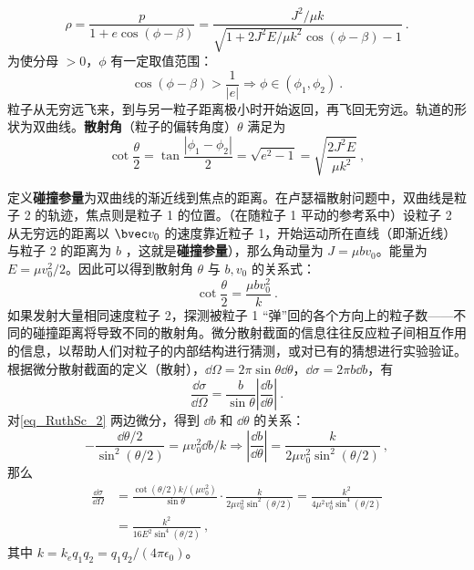 \begin{equation}
\rho=\frac{p}{1+e\cos(\phi-\beta)}=\frac{J^2/\mu k}{\sqrt{1+2J^2E/\mu k^2}\cos(\phi-\beta)-1}~.
\end{equation}
为使分母 $>0$，$\phi$ 有一定取值范围：
\begin{equation}
\cos(\phi-\beta)>\frac{1}{|e|}
\Rightarrow \phi \in (\phi_1,\phi_2)~.
\end{equation}
粒子从无穷远飞来，到与另一粒子距离极小时开始返回，再飞回无穷远。轨道的形状为双曲线。\textbf{散射角}（粒子的偏转角度）$\theta$ 满足为
\begin{equation}
\cot\frac{\theta}{2}=\tan\frac{|\phi_1-\phi_2|}{2} =\sqrt{e^2-1}=\sqrt{\frac{2J^2E}{\mu k^2}}~,
\end{equation}

定义\textbf{碰撞参量}为双曲线的渐近线到焦点的距离。在卢瑟福散射问题中，双曲线是粒子 2 的轨迹，焦点则是粒子 1 的位置。（在随粒子 1 平动的参考系中）设粒子 2 从无穷远的距离以 $\bvec v_0$ 的速度靠近粒子 1，开始运动所在直线（即渐近线）与粒子 2 的距离为 $b$ ，这就是\textbf{碰撞参量}），那么角动量为 $J=\mu bv_0$。能量为 $E=\mu v_0^2/2$。因此可以得到散射角 $\theta$ 与 $b,v_0$ 的关系式：
\begin{equation}\label{eq_RuthSc_2}
\cot \frac{\theta}{2}=\frac{\mu bv_0^2}{k}~.
\end{equation}
如果发射大量相同速度粒子 2，探测被粒子 1 “弹”回的各个方向上的粒子数——不同的碰撞距离将导致不同的散射角。微分散射截面的信息往往反应粒子间相互作用的信息，以帮助人们对粒子的内部结构进行猜测，或对已有的猜想进行实验验证。根据微分散射截面的定义（散射），$\dd \Omega=2\pi \sin\theta \dd \theta$，$\dd \sigma=2\pi b\dd b$，有
\begin{equation}
\frac{\dd \sigma}{\dd \Omega}=\frac{b}{\sin \theta}\left|\frac{\dd b}{\dd \theta}\right|~.
\end{equation}
对\autoref{eq_RuthSc_2} 两边微分，得到 $\dd b$ 和 $\dd \theta$ 的关系：
\begin{equation}
-\frac{\dd \theta/2}{\sin^2(\theta/2)}=\mu v_0^2\dd b/k\Rightarrow \left|\frac{\dd b}{\dd \theta}\right|=\frac{k}{2\mu v_0^2\sin^2(\theta/2)}~,
\end{equation}
那么
\begin{equation}
\begin{aligned}
\frac{\dd \sigma}{\dd \Omega}&=\frac{\cot(\theta/2)k/(\mu v_0^2)}{\sin\theta}\cdot \frac{k}{2\mu v_0^2\sin^2(\theta/2)}=\frac{k^2}{4\mu ^2v_0^4\sin^4(\theta/2)}
\\
&=\frac{k^2}{16E^2\sin^4(\theta/2)}~,
\end{aligned}
\end{equation}
其中 $k=k_eq_1q_2=q_1q_2/(4\pi\epsilon_0)$。
